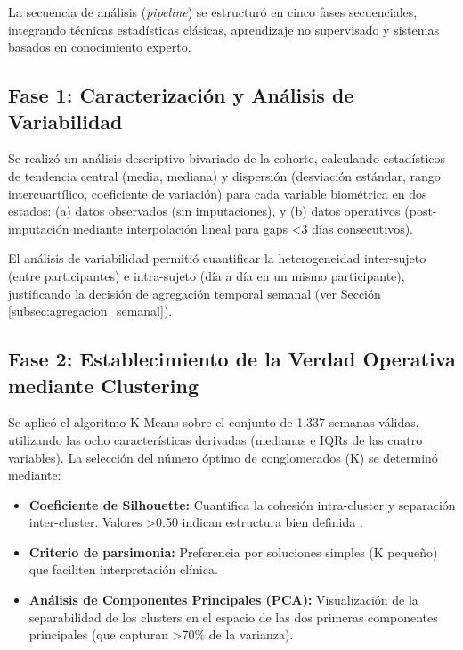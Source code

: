 La secuencia de análisis (\textit{pipeline}) se estructuró en cinco fases secuenciales, integrando técnicas estadísticas clásicas, aprendizaje no supervisado y sistemas basados en conocimiento experto.

\subsection{Fase 1: Caracterización y Análisis de Variabilidad}
\label{subsec:fase1_caracterizacion}

Se realizó un análisis descriptivo bivariado de la cohorte, calculando estadísticos de tendencia central (media, mediana) y dispersión (desviación estándar, rango intercuartílico, coeficiente de variación) para cada variable biométrica en dos estados: (a) datos observados (sin imputaciones), y (b) datos operativos (post-imputación mediante interpolación lineal para gaps <3 días consecutivos).

El análisis de variabilidad permitió cuantificar la heterogeneidad inter-sujeto (entre participantes) e intra-sujeto (día a día en un mismo participante), justificando la decisión de agregación temporal semanal (ver Sección \ref{subsec:agregacion_semanal}).

\subsection{Fase 2: Establecimiento de la Verdad Operativa mediante Clustering}
\label{subsec:fase2_clustering}

Se aplicó el algoritmo K-Means sobre el conjunto de 1,337 semanas válidas, utilizando las ocho características derivadas (medianas e IQRs de las cuatro variables). La selección del número óptimo de conglomerados (K) se determinó mediante:

\begin{itemize}
    \item \textbf{Coeficiente de Silhouette:} Cuantifica la cohesión intra-cluster y separación inter-cluster. Valores >0.50 indican estructura bien definida \cite{Rousseeuw1987}.
    
    \item \textbf{Criterio de parsimonia:} Preferencia por soluciones simples (K pequeño) que faciliten interpretación clínica.
    
    \item \textbf{Análisis de Componentes Principales (PCA):} Visualización de la separabilidad de los clusters en el espacio de las dos primeras componentes principales (que capturan >70\% de la varianza).
\end{itemize}

